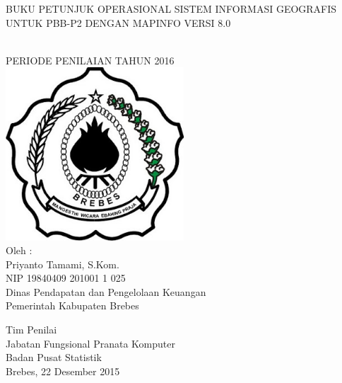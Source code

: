 \begin{titlepage}

\begin{center}
{\large BUKU PETUNJUK OPERASIONAL SISTEM INFORMASI GEOGRAFIS UNTUK PBB-P2 DENGAN MAPINFO VERSI 8.0}

\HRule\\[1cm]

PERIODE PENILAIAN TAHUN 2016\\[1cm]

\includegraphics[width=0.5\textwidth]{./resources/logo}\\[1cm]

Oleh :\\
Priyanto Tamami, S.Kom.\\
NIP 19840409 201001 1 025\\
Dinas Pendapatan dan Pengelolaan Keuangan\\
Pemerintah Kabupaten Brebes\\[1cm]

\vfill

Tim Penilai\\
Jabatan Fungsional Pranata Komputer\\
Badan Pusat Statistik\\
Brebes, 22 Desember 2015
\end{center}

\end{titlepage}